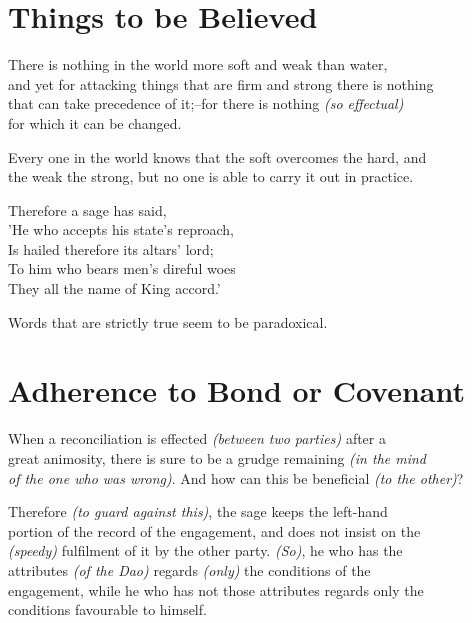 \section*{Things to be Believed}
    There is nothing in the world more soft and weak than water,\\
    and yet for attacking things that are firm and strong there is nothing\\
    that can take precedence of it;--for there is nothing \textit{(so effectual)}\\
    for which it can be changed.\vspace{\baselineskip}
    
    Every one in the world knows that the soft overcomes the hard, and\\
    the weak the strong, but no one is able to carry it out in practice.\vspace{\baselineskip}
    
    Therefore a sage has said,\\
    'He who accepts his state's reproach,\\
    Is hailed therefore its altars' lord;\\
    To him who bears men's direful woes\\
    They all the name of King accord.'\vspace{\baselineskip}
    
    Words that are strictly true seem to be paradoxical.\vspace{\baselineskip}
    
\section*{Adherence to Bond or Covenant}
    When a reconciliation is effected \textit{(between two parties)} after a\\
    great animosity, there is sure to be a grudge remaining \textit{(in the mind\\
    of the one who was wrong)}. And how can this be beneficial \textit{(to the other)}?\vspace{\baselineskip}
    
    Therefore \textit{(to guard against this)}, the sage keeps the left-hand\\
    portion of the record of the engagement, and does not insist on the\\
    \textit{(speedy)} fulfilment of it by the other party. \textit{(So)}, he who has the\\
    attributes \textit{(of the Dao)} regards \textit{(only)} the conditions of the\\
    engagement, while he who has not those attributes regards only the\\
    conditions favourable to himself.\vspace{\baselineskip}
    
